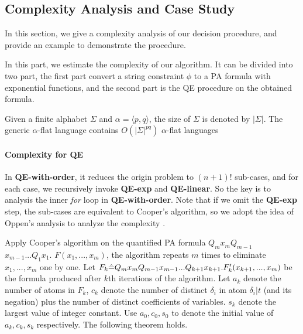 \subsection{Complexity Analysis and Case Study}
In this section, we give a complexity analysis of our decision procedure, and provide an example to demonstrate the procedure.

In this part, we estimate the complexity of our algorithm.
It can be divided into two part, 
the first part convert a string constraint $\phi$ to a PA formula with exponential functions,
and the second part is the QE procedure on the obtained formula.

Given a finite alphabet $\Sigma$ and $\alpha=\langle p,q \rangle$, the size of $\Sigma$ is denoted by
$|\Sigma|$. 
The generic $\alpha$-flat language contains $O(|\Sigma|^{pq})$ $\alpha$-flat languages


\paragraph{Complexity for QE}
In \textbf{QE-with-order},
it reduces the origin problem to $(n+1)!$ sub-cases,
and for each case,
we recursively invoke \textbf{QE-exp} and \textbf{QE-linear}.
So the key is to analysis the inner \textit{for}
loop in \textbf{QE-with-order}.
Note that if we omit the \textbf{QE-exp} step,
the sub-cases are equivalent to Cooper's algorithm,
so we adopt the idea of Oppen's analysis to analyze the complexity
\cite{Oppen}.


Apply Cooper's algorithm on the quantified PA formula 
$Q_m x_m Q_{m-1}$ 
$x_{m-1} ... Q_1 x_1. $
$F(x_1,...,x_m)$,
the algorithm repeats $m$ times to eliminate
$x_1,...,x_m$ one by one.
Let $F_k \hat{=} Q_m x_m Q_{m-1} 
x_{m-1} ... Q_{k+1} x_{k+1}. F_k'(x_{k+1},...,x_m)$
be the formula produced after $k$th iterations of the algorithm. 
Let $a_k$ denote the number of atoms in $F_k$,
$c_k$ denote the number of distinct $\delta_i$ in atom $\delta_i | t$ (and its negation) plus the number of distinct coefficients of variables.
$s_k$ denote the largest value of integer constant.
Use $a_0,c_0,s_0$ to denote the initial value of $a_k,c_k,s_k$ respectively.
The following theorem holds.

